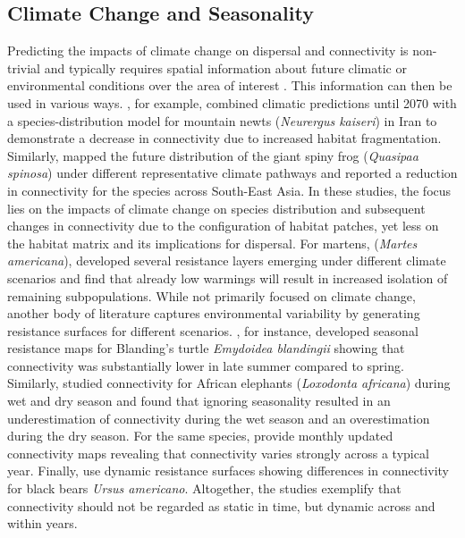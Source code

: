 \documentclass[abstract=on,10pt,a4paper,bibliography=totocnumbered]{article}
\begin{document}
\subsection{Climate Change and Seasonality}
Predicting the impacts of climate change on dispersal and connectivity is
non-trivial and typically requires spatial information about future climatic or
environmental conditions over the area of interest \citep{Littlefield.2019}.
This information can then be used in various ways. \cite{Ashrafzadeh.2019}, for
example, combined climatic predictions until 2070 with a species-distribution
model for mountain newts (\textit{Neurergus kaiseri}) in Iran to demonstrate a
decrease in connectivity due to increased habitat fragmentation. Similarly,
\cite{Luo.2021} mapped the future distribution of the giant spiny frog
(\textit{Quasipaa spinosa}) under different representative climate pathways and
reported a reduction in connectivity for the species across South-East Asia. In
these studies, the focus lies on the impacts of climate change on species
distribution and subsequent changes in connectivity due to the configuration of
habitat patches, yet less on the habitat matrix and its implications for
dispersal. For martens, (\textit{Martes americana}), \cite{Wasserman.2012}
developed several resistance layers emerging under different climate scenarios
and find that already low warmings will result in increased isolation of
remaining subpopulations. While not primarily focused on climate change, another
body of literature captures environmental variability by generating resistance
surfaces for different scenarios. \cite{Mui.2017}, for instance, developed
seasonal resistance maps for Blanding's turtle \textit{Emydoidea blandingii}
showing that connectivity was substantially lower in late summer compared to
spring. Similarly, \cite{Osipova.2019} studied connectivity for African
elephants (\textit{Loxodonta africana}) during wet and dry season and found that
ignoring seasonality resulted in an underestimation of connectivity during the
wet season and an overestimation during the dry season. For the same species,
\cite{Kaszta.2021} provide monthly updated connectivity maps revealing that
connectivity varies strongly across a typical year. Finally, \cite{Zeller.2020}
use dynamic resistance surfaces showing differences in connectivity for black
bears \textit{Ursus americano}. Altogether, the studies exemplify that
connectivity should not be regarded as static in time, but dynamic across and
within years.
\end{document}
